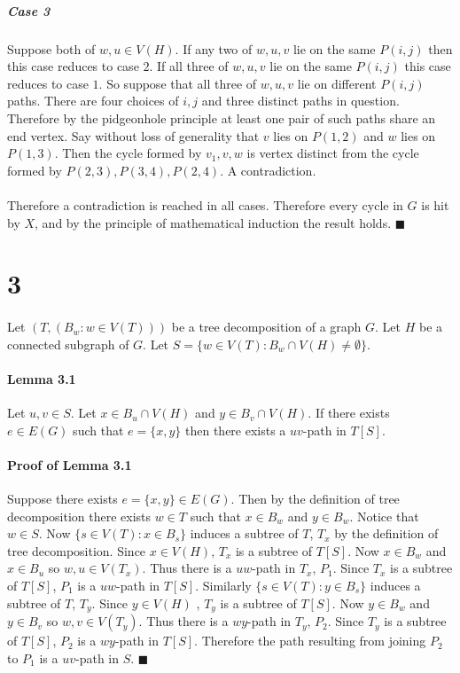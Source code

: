\documentclass[letterpaper,12pt,oneside,onecolumn]{report}
\begin{document}
\subparagraph{Case 3}
Suppose both of $w,u \in V(H)$. If any two of $w,u,v$ lie on the same $P(i,j)$ then this case reduces to case $2$. If all three of $w,u,v$ lie on the same $P(i,j)$ this case reduces to case $1$. So suppose that all three of $w,u,v$ lie on different $P(i,j)$ paths. There are four choices of $i,j$ and three distinct paths in question. Therefore by the pidgeonhole principle at least one pair of such paths share an end vertex. Say without loss of generality that $v$ lies on $P(1,2)$ and $w$ lies on $P(1,3)$. Then the cycle formed by $v_1,v,w$ is vertex distinct from the cycle formed by $P(2,3),P(3,4),P(2,4)$. A contradiction.
\paragraph{}
Therefore a contradiction is reached in all cases.  Therefore every cycle in $G$ is hit by $X$, and by the principle of mathematical induction the result holds. $\blacksquare$
\section*{3}
\paragraph{}
Let $(T,(B_w : w\in V(T)))$ be a tree decomposition of a graph $G$. Let $H$ be a connected subgraph of $G$. Let $S = \{w \in V(T) : B_w \cap V(H) \neq \emptyset \}$.
\paragraph{Lemma 3.1}
Let $u, v \in S$. Let $x \in B_u \cap V(H)$ and $y \in B_v \cap V(H)$. If there exists $e \in E(G)$ such that $e = \{x,y\}$ then there exists a $uv$-path in $T[S]$.
\paragraph{Proof of Lemma 3.1}
Suppose there exists $e=\{x,y\} \in E(G)$. Then by the definition of tree decomposition there exists $w \in T$ such that $x \in B_w$ and $y \in B_w$. Notice that $w \in S$. Now $\{ s \in V(T) : x \in B_s \}$ induces a subtree of $T$, $T_x$ by the definition of tree decomposition. Since $x \in V(H)$, $T_x$ is a subtree of $T[S]$. Now $x \in B_w$ and $x \in B_u$ so $w,u \in V(T_x)$. Thus there is a $uw$-path in $T_x$, $P_1$. Since $T_x$ is a subtree of $T[S]$, $P_1$ is a $uw$-path in $T[S]$. Similarly $\{s \in V(T) : y \in B_s \}$ induces a subtree of $T$, $T_y$. Since $y \in V(H)$ , $T_y$ is a subtree of $T[S]$. Now $y \in B_w$ and $y \in B_v$ so $w,v \in V(T_y)$. Thus there is a $wy$-path in $T_y$, $P_2$. Since $T_y$ is a subtree of $T[S]$, $P_2$ is a $wy$-path in $T[S]$. Therefore the path resulting from joining $P_2$ to $P_1$ is a $uv$-path in $S$. $\blacksquare$
\end{document}
